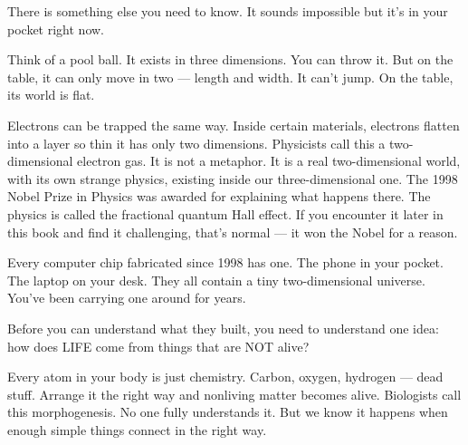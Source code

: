 

There is something else you need to know. It sounds impossible but it's in your pocket right now.

Think of a pool ball. It exists in three dimensions. You can throw it. But on the table, it can only move in two --- length and width. It can't jump. On the table, its world is flat.

Electrons can be trapped the same way. Inside certain materials, electrons flatten into a layer so thin it has only two dimensions. Physicists call this a two-dimensional electron gas. It is not a metaphor. It is a real two-dimensional world, with its own strange physics, existing inside our three-dimensional one. The 1998 Nobel Prize in Physics was awarded for explaining what happens there. The physics is called the fractional quantum Hall effect. If you encounter it later in this book and find it challenging, that's normal --- it won the Nobel for a reason.

Every computer chip fabricated since 1998 has one. The phone in your pocket. The laptop on your desk. They all contain a tiny two-dimensional universe. You've been carrying one around for years.




Before you can understand what they built, you need to understand one idea: how does LIFE come from things that are NOT alive?

Every atom in your body is just chemistry. Carbon, oxygen, hydrogen --- dead stuff. Arrange it the right way and nonliving matter becomes alive. Biologists call this morphogenesis. No one fully understands it. But we know it happens when enough simple things connect in the right way.

